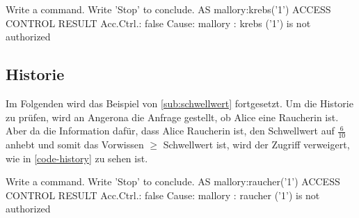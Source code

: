 \documentclass[german,version-2020-11]{uzl-thesis}
\begin{document}
\begin{Pseudocode}[caption={Angerona Ergebnis für Schwellwert=$\frac{34}{80}$}, label={code-thresholdNoAccess}]
Write a command. Write 'Stop' to conclude.
AS mallory:krebs('1')
ACCESS CONTROL RESULT
	Acc.Ctrl.: false Cause: mallory : krebs ('1') is not authorized
\end{Pseudocode}

\subsection{Historie}
Im Folgenden wird das Beispiel von \cref{sub:schwellwert} fortgesetzt. Um die Historie zu prüfen, wird an Angerona die Anfrage gestellt, ob Alice eine Raucherin ist. Aber da die Information dafür, dass Alice Raucherin ist, den Schwellwert auf $\frac{6}{10}$ anhebt und somit das Vorwissen $\geq$ Schwellwert ist, wird der Zugriff verweigert, wie in \autoref{code-history} zu sehen ist. 

\begin{Pseudocode}[caption={Angerona Ergebnis für die Abfrage, ob Alice Raucherin ist}, label={code-history}]
Write a command. Write 'Stop' to conclude.
AS mallory:raucher('1')
ACCESS CONTROL RESULT
	Acc.Ctrl.: false Cause: mallory : raucher ('1') is not authorized
\end{Pseudocode}
\end{document}
